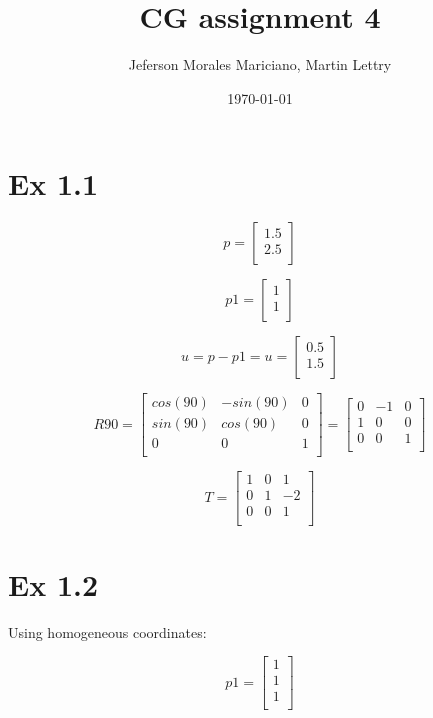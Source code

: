 \documentclass{article}
\title{CG assignment 4}
\author{Jeferson Morales Mariciano, Martin Lettry}
\date{\today}
\begin{document}
\maketitle

\section*{Ex 1.1}

\[
    p = \begin{bmatrix}
        1.5 \\
        2.5 \\
    \end{bmatrix}
\]

\[
    p1 = \begin{bmatrix}
        1 \\
        1 \\
    \end{bmatrix}
\]


\[
    u = p - p1 =
    u = \begin{bmatrix}
        0.5 \\
        1.5 \\
    \end{bmatrix}
\]

\[
    R90 =
    \begin{bmatrix}
        cos(90) & -sin(90) & 0 \\
        sin(90) & cos(90)  & 0 \\
        0       & 0        & 1 \\
    \end{bmatrix}
    =
    \begin{bmatrix}
        0 & -1 & 0 \\
        1 & 0  & 0 \\
        0 & 0  & 1 \\
    \end{bmatrix}
\]


\[
    T = \begin{bmatrix}
        1 & 0 & 1  \\
        0 & 1 & -2 \\
        0 & 0 & 1  \\
    \end{bmatrix}
\]


\section*{Ex 1.2}
Using homogeneous coordinates:

\[
    p1 = \begin{bmatrix}
        1 \\
        1 \\
        1 \\
    \end{bmatrix}
\]
\end{document}
